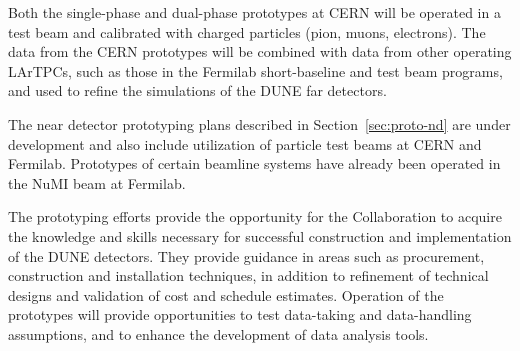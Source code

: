 Both the single-phase and dual-phase prototypes at CERN will be
operated in a test beam and calibrated with charged particles (pion,
muons, electrons). The data from the CERN prototypes will be combined
with data from other operating LArTPCs, such as those in the Fermilab
short-baseline and test beam programs, and used to refine the
simulations of the DUNE far detectors.

The near detector prototyping plans described in
Section~\ref{sec:proto-nd} are under development and also include
utilization of particle test beams at CERN and Fermilab.  Prototypes
of certain beamline systems have already been operated in the NuMI
beam at Fermilab.

The prototyping efforts provide the opportunity for the Collaboration
to acquire the knowledge and skills necessary for successful
construction and implementation of the DUNE detectors. They provide
guidance in areas such as procurement, construction and installation
techniques, in addition to refinement of technical designs and validation of
cost and schedule estimates.  Operation of the prototypes will provide
opportunities to test data-taking and data-handling assumptions, and
to enhance the development of data analysis tools.



